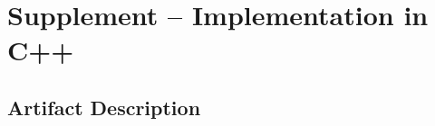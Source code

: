 \chapter{Supplement -- Implementation in C++}
\label{App_B:Implementation}
\chaptertoc

\section{Artifact Description}
\label{App_B:Chameleon}

